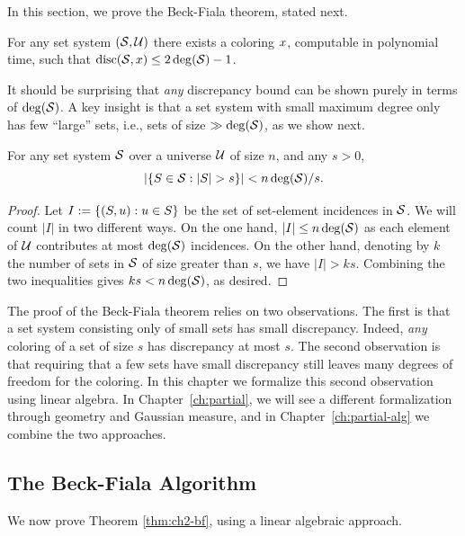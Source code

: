In this section, we prove the Beck-Fiala theorem, stated next.
\begin{theorem}\label{thm:ch2-bf}
  For any set system \((\mathcal{S}, \mathcal{U})\) there exists a coloring \(x\),
  computable in polynomial time, such that \(\operatorname{disc}(\mathcal{S},x) \le 2\operatorname{deg}(\mathcal{S})-1\).
\end{theorem}

It should be surprising that
\emph{any} discrepancy bound can be shown purely in terms of $\operatorname{deg}(\mathcal{S})$. A key
insight is that a set system with small maximum degree only has few ``large'' sets, i.e., sets of size \(\gg \operatorname{deg}(\mathcal{S})\), as we show next.
\begin{lemma}\label{lm:ch2-bf-counting}
  For any set system \(\mathcal{S}\) over a universe $\mathcal{U}$ of size \(n\), and
  any \(s>0\),   \[
    |\{S \in \mathcal{S}: |S| > s\}| < n\operatorname{deg}(\mathcal{S})/s.
  \]
\end{lemma}
\begin{proof}
  Let \(I := \{(S, u): u \in S\}\) be the set of
  set-element incidences in \(\mathcal{S}\). We will count \(|I|\) in two
  different ways. On the one hand, $|I| \le n\operatorname{deg}(\mathcal{S})$ as each
  element of $\mathcal{U}$ contributes at most $\operatorname{deg}(\mathcal{S})$ incidences. 
  On the other hand, denoting by \(k\) the number of sets in \(\mathcal{S}\)
  of size greater than \(s\), we have \(|I| > ks\).
  Combining the two inequalities gives \(ks < n\operatorname{deg}(\mathcal{S})\), as desired.
\end{proof}

The proof of the Beck-Fiala theorem relies on two observations. The
first is that a set system consisting only of small sets has small
discrepancy. Indeed, \emph{any} coloring of a set of size \(s\) has
discrepancy at most \(s\). The second observation is that requiring that a few sets have small discrepancy still leaves many degrees of freedom for the coloring. In this chapter we formalize this second observation using linear algebra. In Chapter~\ref{ch:partial}, we will see a different formalization through geometry and Gaussian measure, and in Chapter~\ref{ch:partial-alg} we combine the two approaches.

\subsection{The Beck-Fiala Algorithm}
We now prove Theorem \ref{thm:ch2-bf}, using a linear algebraic approach.

